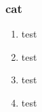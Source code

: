 \begin{frame}
  \frametitle{cat}
	 \begin{enumerate}
	    \item test
	    \item test
	    \item test
	    \item test
	  \end{enumerate}
\end{frame}